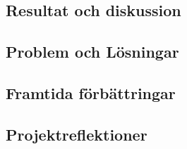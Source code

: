 \documentclass[a4paper]{article}
\begin{document}
\begin{multicols}{2}
\section{Resultat och diskussion}

        \subsection{Problem och Lösningar}

        \subsection{Framtida förbättringar}

        \subsection{Projektreflektioner}

    \nocite{*} %
    
    
\end{multicols}
\end{document}
